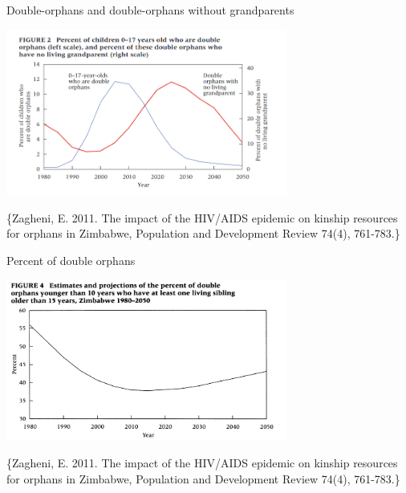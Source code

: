 \documentclass[
  ignorenonframetext,
]{beamer}
\begin{document}
\begin{frame}{Double-orphans and double-orphans without grandparents}
\protect\hypertarget{double-orphans-and-double-orphans-without-grandparents}{}

\includegraphics[width=3.64583in,height=\textheight]{resources/zagheni_orphans.PNG}

\tiny\{Zagheni, E. 2011. The impact of the HIV/AIDS epidemic on kinship
resources for orphans in Zimbabwe, Population and Development Review
74(4), 761-783.\}

\end{frame}

\begin{frame}{Percent of double orphans}
\protect\hypertarget{percent-of-double-orphans}{}

\includegraphics[width=3.64583in,height=\textheight]{resources/zag4.PNG}

\tiny\{Zagheni, E. 2011. The impact of the HIV/AIDS epidemic on kinship
resources for orphans in Zimbabwe, Population and Development Review
74(4), 761-783.\}

\end{frame}
\end{document}
